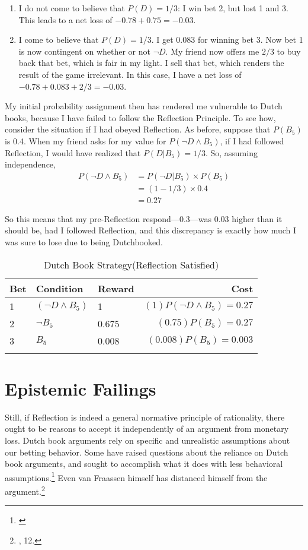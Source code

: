 \begin{enumerate}
\def\labelenumi{\arabic{enumi}.}
\tightlist
\item
  I do not come to believe that \(P(D) = 1/3\): I win bet 2, but lost 1
  and 3. This leads to a net loss of \(-0.78 + 0.75 = -0.03\).
\item
  I come to believe that \(P(D) = 1/3\). I get \(0.083\) for winning bet
  3. Now bet 1 is now contingent on whether or not \(\neg D\). My friend
  now offers me \(2/3\) to buy back that bet, which is fair in my light.
  I sell that bet, which renders the result of the game irrelevant. In
  this case, I have a net loss of \(-0.78+0.083+2/3 = -0.03\).
\end{enumerate}

My initial probability assignment then has rendered me vulnerable to
Dutch books, because I have failed to follow the Reflection Principle.
To see how, consider the situation if I had obeyed Reflection. As
before, suppose that \(P(B_5)\) is 0.4. When my friend asks for my value
for \(P(\neg D \wedge B_5)\), if I had followed Reflection, I would have
realized that \(P(D|B_5)=1/3\). So, assuming independence,
\begin{align*}
P(\neg D \wedge B_5) &= P(\neg D |B_5)\times P(B_5)\\
&= (1-1/3) \times 0.4\\
&= 0.27
\end{align*}

So this means that my pre-Reflection respond---\(0.3\)---was \(0.03\)
higher than it should be, had I followed Reflection, and this
discrepancy is exactly how much I was sure to lose due to being
Dutchbooked.

\begin{longtable}[]{@{}lllr@{}}
\toprule
Bet & Condition & Reward & Cost\tabularnewline
\midrule
\endhead
1 & \((\neg D \wedge B_5)\) & 1 &
\((1)P(\neg D \wedge B_5) =0.27\)\tabularnewline
2 & \(\neg B_5\) & 0.675 &
\((0.75)P(B_5)=0.27\)\tabularnewline
3 & \(B_5\) & 0.008 &
\((0.008)P(B_5) = 0.003\)\tabularnewline
\bottomrule
\caption{Dutch Book Strategy(Reflection Satisfied)}
\label{tab:dutchbooknoloss}
\end{longtable}

\hypertarget{epistemic-failings}{%
\section{Epistemic Failings}\label{epistemic-failings}}

Still, if Reflection is indeed a general normative principle of rationality,
there ought to be reasons to accept it independently of an argument from monetary
loss. Dutch book arguments rely on specific and unrealistic assumptions
about our betting behavior. Some have raised questions about the
reliance on Dutch book arguments, and sought to accomplish what it does with less behavioral assumptions.\footnote{\cite{joycenonprag}} Even van Fraassen himself has
distanced himself from the argument.\footnote{\cite{beliefuly}, 12.}

